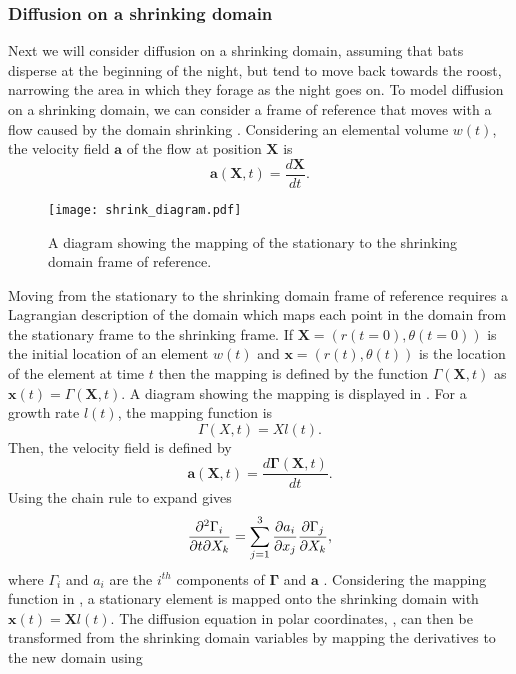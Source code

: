 \subsubsection{Diffusion on a shrinking domain} \label{shrink}
 Next we will consider diffusion on a shrinking domain, assuming that bats disperse at the beginning of the night, but tend to move back towards the roost, narrowing the area in which they forage as the night goes on. To model diffusion on a shrinking domain, we can consider a frame of reference that moves with a flow caused by the domain shrinking \cite{crampin1999reaction}. Considering an elemental volume $w(t)$, the velocity field $\bm{a}$ of the flow at position $\bm{X}$ is
%
\begin{equation}
\bm{a}(\bm{X},t) = \frac{d\bm{X}}{dt}.
\end{equation}
%
\begin{figure} [h]
    \centering
        \texttt{[image: shrink\_diagram.pdf]}
        \caption{A diagram showing the mapping of the stationary to the shrinking domain frame of reference. }
    \label{fig:shrink_diagram}
\end{figure}
%
Moving from the stationary to the shrinking domain frame of reference requires a Lagrangian description of the domain which maps each point in the domain from the stationary frame to the shrinking frame. If $\bm{X} = (r(t=0),\theta(t=0))$ is the initial location of an element $w(t)$ and $\bm{x} = (r(t),\theta(t))$ is the location of the element at time $t$ then the mapping is defined by the function $\Gamma(\bm{X},t) $ as $\bm{x}(t) =\Gamma(\bm{X},t) $. A diagram showing the mapping is displayed in . For a growth rate $l(t)$, the mapping function is
%
\begin{equation}
\Gamma(X,t) = Xl(t).
\label{eqn:mapping}
\end{equation}
%
Then, the velocity field is defined by
%
\begin{equation}
\bm{a}(\bm{X},t) = \frac{d\bm{\Gamma}(\bm{X},t)}{dt} .
\label{dgammadt}
\end{equation}
%
Using the chain rule to expand  gives
%
\begin{equation}
    \frac{\partial^2 \Gamma_i}{\partial t\partial X_k} = \sum_{j=1}^{3}\frac{\partial a_i}{\partial x_j}\frac{\partial \Gamma_j}{\partial X_k},
\end{equation}
%
where $\Gamma_i$ and $a_i$ are the $i^{th}$ components of $\bm{\Gamma}$ and $\bm{a}$ \cite{crampinnonuniform}.
Considering the mapping function in , a stationary element is mapped onto the shrinking domain with $\bm{x}(t) = \bm{X}l(t)$. The diffusion equation in polar coordinates, , can then be transformed from the shrinking domain variables by mapping the derivatives to the new domain using
